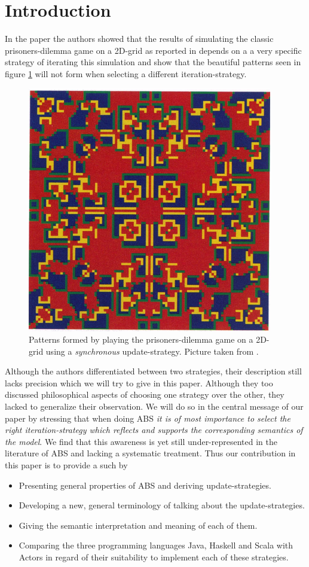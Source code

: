 \section{Introduction}
In the paper \cite{huberman_evolutionary_1993} the authors showed that the results of simulating the classic prisoners-dilemma game on a 2D-grid as reported in \cite{nowak_evolutionary_1992} depends on a a very specific strategy of iterating this simulation and show that the beautiful patterns seen in figure \ref{fig:sync_patterns} will not form when selecting a different iteration-strategy.

\begin{figure}[H]
	\centering
  \includegraphics[width=.4\textwidth, angle=0]{./fig/sync_patterns.png}
	\caption{Patterns formed by playing the prisoners-dilemma game on a 2D-grid using a \textit{synchronous} update-strategy. Picture taken from \cite{huberman_evolutionary_1993}.}
	\label{fig:sync_patterns}
\end{figure}

Although the authors differentiated between two strategies, their description still lacks precision which we will try to give in this paper. Although they too discussed philosophical aspects of choosing one strategy over the other, they lacked to generalize their observation. We will do so in the central message of our paper by stressing that when doing ABS \textit{it is of most importance to select the right iteration-strategy which reflects and supports the corresponding semantics of the model}. We find that this awareness is yet still under-represented in the literature of ABS and lacking a systematic treatment. Thus our contribution in this paper is to provide a such by
\begin{itemize}
	\item Presenting general properties of ABS and deriving update-strategies.
	\item Developing a new, general terminology of talking about the update-strategies.
	\item Giving the semantic interpretation and meaning of each of them.
	\item Comparing the three programming languages Java, Haskell and Scala with Actors in regard of their suitability to implement each of these strategies.
\end{itemize}

